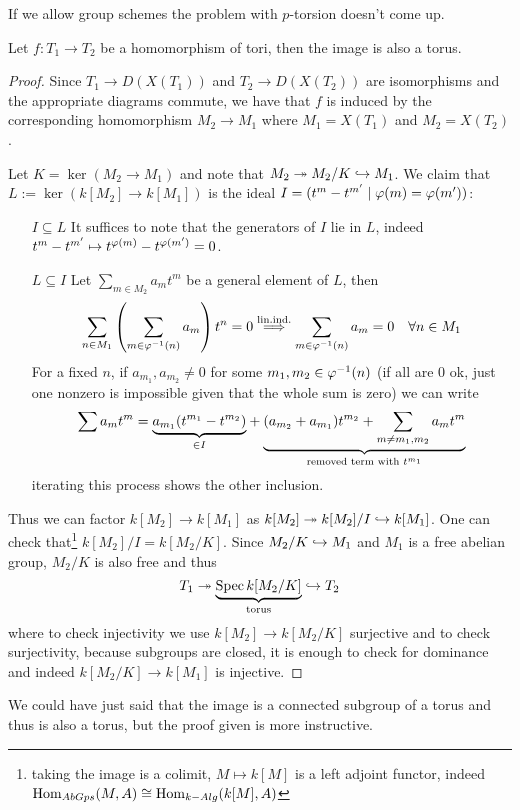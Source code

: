 \begin{remark}
If we allow group schemes the problem with $p$-torsion doesn't come up.
\end{remark}















\begin{proposition}
Let $f:T_1\to T_2$ be a homomorphism of tori, then the image is also a torus.
\end{proposition}
\begin{proof}
Since $T_1\to D(X(T_1))$ and $T_2\to D(X(T_2))$ are isomorphisms and the appropriate diagrams commute, we have that $f$ is induced by the corresponding homomorphism $M_2\to M_1$ where $M_1=X(T_1)$ and $M_2=X(T_2)$.

Let $K=\ker(M_2\to M_1)$ and note that $M_2\twoheadrightarrow M_2/K\hookrightarrow M_1$. We claim that $L:=\ker(k[M_2]\to k[M_1])$ is the ideal $I=(t^m-t^{m'}\mid \varphi(m)=\varphi(m'))$:
\setlength{\leftmargini}{0cm}
\begin{itemize}
\item[$\boxed{I\subseteq L}$] It suffices to note that the generators of $I$ lie in $L$, indeed $t^m-t^{m'}\mapsto t^{\varphi(m)}-t^{\varphi(m')}=0$.
\item[$\boxed{L\subseteq I}$] Let $\sum_{m\in M_2}a_mt^m$ be a general element of $L$, then
\[\sum_{n\in M_1}\left({\sum_{m\in \varphi^{-1}(n)}a_m}\right)t^n=0\overset{\text{lin.ind.}}\Longrightarrow \sum_{m\in \varphi^{-1}(n)}a_m=0\quad \forall n\in M_1\]
For a fixed $n$, if $a_{m_1},a_{m_2}\neq 0$ for some $m_1,m_2\in \varphi^{-1}(n)$ (if all are $0$ ok, just one nonzero is impossible given that the whole sum is zero) we can write
\[\sum a_m t^m=\underset{\in I}{\underbrace{a_{m_1}(t^{m_1}-t^{m_2})}}+\underset{\text{removed term with }t^{m_1}}{\underbrace{(a_{m_2}+a_{m_1})t^{m_2}+\sum_{m\neq m_1,m_2}a_mt^m}}\]
iterating this process shows the other inclusion.
\end{itemize}
\setlength{\leftmargini}{0.5cm}
Thus we can factor $k[M_2]\to k[M_1]$ as $k[M_2]\twoheadrightarrow k[M_2]/I\hookrightarrow k[M_1]$. One can check that\footnote{taking the image is a colimit, $M\mapsto k[M]$ is a left adjoint functor, indeed $\operatorname{Hom}_{AbGps}(M,A)\cong \operatorname{Hom}_{k-Alg}(k[M],A)$} $k[M_2]/I=k[M_2/K]$. Since $M_2/K\hookrightarrow M_1$ and $M_1$ is a free abelian group, $M_2/K$ is also free and thus
\[T_1\twoheadrightarrow \underset{\text{torus}}{\underbrace{\operatorname{Spec} k[M_2/K]}}\hookrightarrow T_2\]
where to check injectivity we use $k[M_2]\to k[M_2/K]$ surjective and to check surjectivity, because subgroups are closed, it is enough to check for dominance and indeed $k[M_2/K]\to k[M_1]$ is injective.
\end{proof}

\begin{remark}
We could have just said that the image is a connected subgroup of a torus and thus is also a torus, but the proof given is more instructive.
\end{remark}











